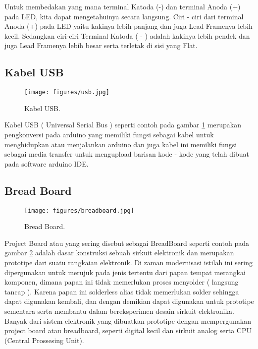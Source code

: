 


Untuk membedakan yang mana terminal Katoda (-) dan terminal Anoda (+) pada LED, kita dapat mengetahuinya secara langsung. Ciri - ciri dari terminal Anoda (+) pada LED yaitu kakinya lebih panjang dan juga Lead Framenya lebih kecil. Sedangkan ciri-ciri Terminal Katoda ( - ) adalah kakinya lebih pendek dan juga Lead Framenya lebih besar serta terletak di sisi yang Flat.
\subsection{Kabel USB}
\begin{figure}[ht]
\centerline{\texttt{[image: figures/usb.jpg]}}
\caption{Kabel USB.}
\label{usb}
\end{figure}
Kabel USB ( Universal Serial Bus ) seperti contoh pada gambar \ref{usb} merupakan pengkonversi pada arduino yang memiliki fungsi sebagai kabel untuk menghidupkan atau menjalankan arduino dan juga kabel ini memiliki fungsi sebagai media transfer untuk mengupload barisan kode - kode yang telah dibuat pada software arduino IDE.

\subsection{Bread Board}
\begin{figure}[ht]
\centerline{\texttt{[image: figures/breadboard.jpg]}}
\caption{Bread Board.}
\label{breadboard}
\end{figure}
Project Board atau yang sering disebut sebagai BreadBoard seperti contoh pada gambar \ref{breadboard} adalah dasar konstruksi sebuah sirkuit elektronik dan merupakan prototipe dari suatu rangkaian elektronik. Di zaman modernisasi istilah ini sering dipergunakan untuk merujuk pada jenis tertentu dari papan tempat merangkai komponen, dimana papan ini tidak memerlukan proses menyolder ( langsung tancap ).
Karena papan ini solderless alias tidak memerlukan solder sehingga dapat digunakan kembali, dan dengan demikian dapat digunakan untuk prototipe sementara serta membantu dalam bereksperimen desain sirkuit elektronika. Banyak dari sistem elektronik yang dibuatkan prototipe dengan mempergunakan project board atau breadboard, seperti digital kecil dan sirkuit analog serta CPU (Central Prossesing Unit).

